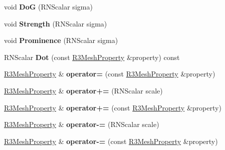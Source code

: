 \begin{DoxyCompactItemize}
\item 
void {\bfseries DoG} (R\+N\+Scalar sigma)\hypertarget{struct_r3_mesh_property_a2d0fa1fa3d79a2bf0ba534eaf258ed31}{}\label{struct_r3_mesh_property_a2d0fa1fa3d79a2bf0ba534eaf258ed31}

\item 
void {\bfseries Strength} (R\+N\+Scalar sigma)\hypertarget{struct_r3_mesh_property_a96cbc8e08cf0336236fa58d579aa4381}{}\label{struct_r3_mesh_property_a96cbc8e08cf0336236fa58d579aa4381}

\item 
void {\bfseries Prominence} (R\+N\+Scalar sigma)\hypertarget{struct_r3_mesh_property_aeeefe332a7e345f08d4940a19ac92f05}{}\label{struct_r3_mesh_property_aeeefe332a7e345f08d4940a19ac92f05}

\item 
R\+N\+Scalar {\bfseries Dot} (const \hyperlink{struct_r3_mesh_property}{R3\+Mesh\+Property} \&property) const \hypertarget{struct_r3_mesh_property_ae2ebeb5ca5c32facbee89da3b0b0c5f0}{}\label{struct_r3_mesh_property_ae2ebeb5ca5c32facbee89da3b0b0c5f0}

\item 
\hyperlink{struct_r3_mesh_property}{R3\+Mesh\+Property} \& {\bfseries operator=} (const \hyperlink{struct_r3_mesh_property}{R3\+Mesh\+Property} \&property)\hypertarget{struct_r3_mesh_property_aa7c09bb9b8b8b2881551a4373b81917a}{}\label{struct_r3_mesh_property_aa7c09bb9b8b8b2881551a4373b81917a}

\item 
\hyperlink{struct_r3_mesh_property}{R3\+Mesh\+Property} \& {\bfseries operator+=} (R\+N\+Scalar scale)\hypertarget{struct_r3_mesh_property_ae38ea0e1e79485bcc623828c8f97205c}{}\label{struct_r3_mesh_property_ae38ea0e1e79485bcc623828c8f97205c}

\item 
\hyperlink{struct_r3_mesh_property}{R3\+Mesh\+Property} \& {\bfseries operator+=} (const \hyperlink{struct_r3_mesh_property}{R3\+Mesh\+Property} \&property)\hypertarget{struct_r3_mesh_property_a1dbe840bad05ece50bb64ec42eca7bbd}{}\label{struct_r3_mesh_property_a1dbe840bad05ece50bb64ec42eca7bbd}

\item 
\hyperlink{struct_r3_mesh_property}{R3\+Mesh\+Property} \& {\bfseries operator-\/=} (R\+N\+Scalar scale)\hypertarget{struct_r3_mesh_property_a896fae097097c89868dafd777e34bf66}{}\label{struct_r3_mesh_property_a896fae097097c89868dafd777e34bf66}

\item 
\hyperlink{struct_r3_mesh_property}{R3\+Mesh\+Property} \& {\bfseries operator-\/=} (const \hyperlink{struct_r3_mesh_property}{R3\+Mesh\+Property} \&property)\hypertarget{struct_r3_mesh_property_a8258be20ea32ec8425e1552fb9c9aa8b}{}\label{struct_r3_mesh_property_a8258be20ea32ec8425e1552fb9c9aa8b}


\end{DoxyCompactItemize}
